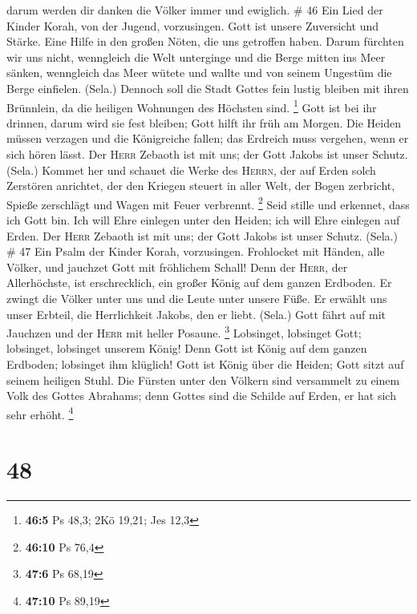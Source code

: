 darum werden dir danken die Völker immer und ewiglich. \# 46
 Ein Lied der Kinder Korah, von der Jugend, vorzusingen.
 Gott ist unsere Zuversicht und Stärke. Eine Hilfe in den
großen Nöten, die uns getroffen haben.  Darum fürchten wir
uns nicht, wenngleich die Welt unterginge und die Berge mitten ins Meer
sänken,  wenngleich das Meer wütete und wallte und von
seinem Ungestüm die Berge einfielen. (Sela.)  Dennoch soll
die Stadt Gottes fein lustig bleiben mit ihren Brünnlein, da die
heiligen Wohnungen des Höchsten sind. \footnote{\textbf{46:5} Ps 48,3;
  2Kö 19,21; Jes 12,3}  Gott ist bei ihr drinnen, darum
wird sie fest bleiben; Gott hilft ihr früh am Morgen.  Die
Heiden müssen verzagen und die Königreiche fallen; das Erdreich muss
vergehen, wenn er sich hören lässt.  Der \textsc{Herr}
Zebaoth ist mit uns; der Gott Jakobs ist unser Schutz. (Sela.)
 Kommet her und schauet die Werke des \textsc{Herrn}, der
auf Erden solch Zerstören anrichtet,  der den Kriegen
steuert in aller Welt, der Bogen zerbricht, Spieße zerschlägt und Wagen
mit Feuer verbrennt. \footnote{\textbf{46:10} Ps 76,4} 
Seid stille und erkennet, dass ich Gott bin. Ich will Ehre einlegen
unter den Heiden; ich will Ehre einlegen auf Erden.  Der
\textsc{Herr} Zebaoth ist mit uns; der Gott Jakobs ist unser Schutz.
(Sela.) \# 47  Ein Psalm der Kinder Korah, vorzusingen.
 Frohlocket mit Händen, alle Völker, und jauchzet Gott mit
fröhlichem Schall!  Denn der \textsc{Herr}, der
Allerhöchste, ist erschrecklich, ein großer König auf dem ganzen
Erdboden.  Er zwingt die Völker unter uns und die Leute
unter unsere Füße.  Er erwählt uns unser Erbteil, die
Herrlichkeit Jakobs, den er liebt. (Sela.)  Gott fährt auf
mit Jauchzen und der \textsc{Herr} mit heller Posaune. \footnote{\textbf{47:6}
  Ps 68,19}  Lobsinget, lobsinget Gott; lobsinget,
lobsinget unserem König!  Denn Gott ist König auf dem
ganzen Erdboden; lobsinget ihm klüglich!  Gott ist König
über die Heiden; Gott sitzt auf seinem heiligen Stuhl. 
Die Fürsten unter den Völkern sind versammelt zu einem Volk des Gottes
Abrahams; denn Gottes sind die Schilde auf Erden, er hat sich sehr
erhöht. \footnote{\textbf{47:10} Ps 89,19}

\hypertarget{section-20}{%
\section{48}\label{section-20}}

